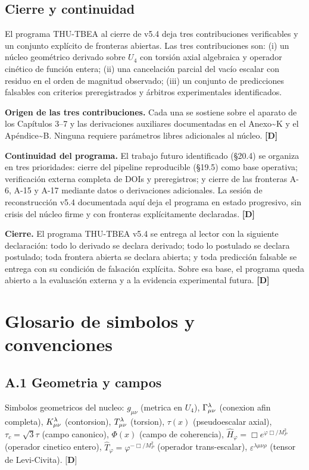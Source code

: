 ﻿\documentclass[11pt,letterpaper]{article}
\begin{document}
\subsection{Cierre y continuidad}
El programa THU-TBEA al cierre de v5.4 deja tres contribuciones verificables y un conjunto explícito de fronteras abiertas. Las tres contribuciones son: (i) un núcleo geométrico derivado sobre $U_4$ con torsión axial algebraica y operador cinético de función entera; (ii) una cancelación parcial del vacío escalar con residuo en el orden de magnitud observado; (iii) un conjunto de predicciones falsables con criterios preregistrados y árbitros experimentales identificados.

\textbf{Origen de las tres contribuciones.} Cada una se sostiene sobre el aparato de los Capítulos 3--7 y las derivaciones auxiliares documentadas en el Anexo\textasciitilde{}K y el Apéndice\textasciitilde{}B. Ninguna requiere parámetros libres adicionales al núcleo. \textbf{[D]}

\textbf{Continuidad del programa.} El trabajo futuro identificado (§20.4) se organiza en tres prioridades: cierre del pipeline reproducible (§19.5) como base operativa; verificación externa completa de DOIs y preregistros; y cierre de las fronteras A-6, A-15 y A-17 mediante datos o derivaciones adicionales. La sesión de reconstrucción v5.4 documentada aquí deja el programa en estado progresivo, sin crisis del núcleo firme y con fronteras explícitamente declaradas. \textbf{[D]}

\textbf{Cierre.} El programa THU-TBEA v5.4 se entrega al lector con la siguiente declaración: todo lo derivado se declara derivado; todo lo postulado se declara postulado; toda frontera abierta se declara abierta; y toda predicción falsable se entrega con su condición de falsación explícita. Sobre esa base, el programa queda abierto a la evaluación externa y a la evidencia experimental futura. \textbf{[D]}

\newpage
\appendix

\section{Glosario de simbolos y convenciones}
\subsection{A.1 Geometria y campos}
Simbolos geometricos del nucleo: $g_{\mu\nu}$ (metrica en $U_4$), $\Gamma^\lambda_{\\ \mu\nu}$ (conexion afin completa), $K^\lambda_{\\ \mu\nu}$ (contorsion), $T^\lambda_{\\ \mu\nu}$ (torsion), $\tau(x)$ (pseudoescalar axial), $\tau_c = \sqrt{3}\tau$ (campo canonico), $\Phi(x)$ (campo de coherencia), $\hat{H}_\varphi = \Box e^{\varphi\Box/M_P^2}$ (operador cinetico entero), $\hat{T}_\varphi = \varphi^{-\Box/M_P^2}$ (operador trans-escalar), $\varepsilon^{\lambda\mu\nu\rho}$ (tensor de Levi-Civita). $\textbf{[D]}$
\end{document}

